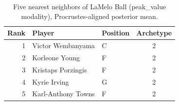 \begin{table}[htbp]
  \centering\small
  \begin{tabular}{rllc}
    \toprule
    Rank & Player & Position & Archetype \\
    \midrule
    1 & Victor Wembanyama & C & 2 \\
    2 & Korleone Young & F & 2 \\
    3 & Kristaps Porzingis & F & 2 \\
    4 & Kyrie Irving & G & 2 \\
    5 & Karl-Anthony Towns & F & 2 \\
    \bottomrule
  \end{tabular}
  \caption{Five nearest neighbors of LaMelo Ball (peak_value modality), Procrustes-aligned posterior mean.}
  \label{tab:LaMelo_Ball_neighbors_peak_value}
\end{table}

